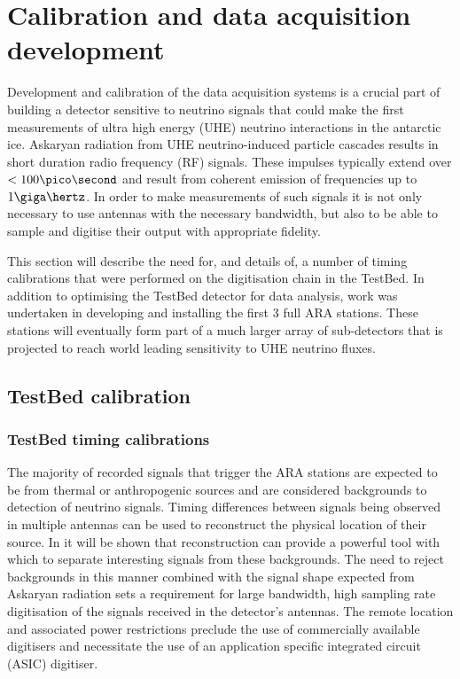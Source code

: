 \chapter{Calibration and data acquisition development}
\label{chap:Calibration}

 Development and calibration of the data acquisition systems is a crucial part of building a detector sensitive to neutrino signals that could make the first measurements of ultra high energy (UHE) neutrino interactions in the antarctic ice. Askaryan radiation from UHE neutrino-induced particle cascades results in short duration radio frequency (RF) signals. These impulses typically extend over $< 100 \pico \second$ and result from coherent emission of frequencies up to $1 \giga \hertz$. In order to make measurements of such signals it is not only necessary to use antennas with the necessary bandwidth, but also to be able to sample and digitise their output with appropriate fidelity.


This section will describe the need for, and details of, a number of timing calibrations that were performed on the digitisation chain in the TestBed. In addition to optimising the TestBed detector for data analysis, work was undertaken in developing and installing the first 3 full ARA stations. These stations will eventually form part of a much larger array of sub-detectors that is projected to reach world leading sensitivity to UHE neutrino fluxes.

\section{TestBed calibration}
\label{sec:calibration:TestBed-calibration}



\subsection{TestBed timing calibrations}
\label{sec:calibration:LABRADOR-Digitiser-Chip}

The majority of recorded signals that trigger the ARA stations are expected to be from thermal or anthropogenic sources and are considered backgrounds to detection of neutrino signals. Timing differences between signals being observed in multiple antennas can be used to reconstruct the physical location of their source. In  it will be shown that reconstruction can provide a powerful tool with which to separate interesting signals from these backgrounds. The need to reject backgrounds in this manner combined with the signal shape expected from Askaryan radiation sets a requirement for large bandwidth, high sampling rate digitisation of the signals received in the detector's antennas. The remote location and associated power restrictions preclude the use of commercially available digitisers and necessitate the use of an application specific integrated circuit (ASIC) digitiser.

